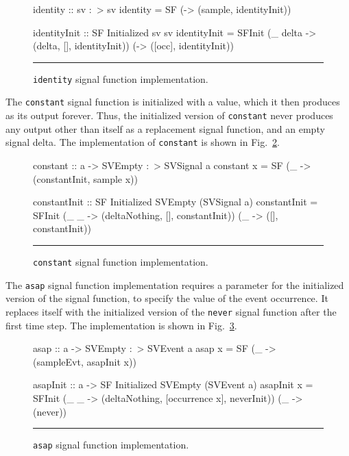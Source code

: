 \documentclass[draft]{llncs}
\begin{document}
\begin{figure}[t]
\begin{code}
identity :: sv :~> sv
identity = SF (\sample -> (sample, identityInit))

identityInit :: SF Initialized sv sv
identityInit = SFInit (\_ delta -> (delta, [], identityInit))
                      (\occ -> ([occ], identityInit))
\end{code}
\hrule
\caption{{\tt identity} signal function implementation.}
\label{figure:identity_signal_function_implementation}
\end{figure}

The {\tt constant} signal function is initialized with a value, which it then
produces as its output forever. Thus, the initialized version of {\tt constant}
never produces any output other than itself as a replacement
signal function, and an empty signal delta. The implementation of {\tt constant}
is shown in Fig.~\ref{figure:constant_signal_function_implementation}.

\begin{figure}
\begin{code}
constant :: a -> SVEmpty :~> SVSignal a
constant x = SF (\_ -> (constantInit, sample x))

constantInit :: SF Initialized SVEmpty (SVSignal a)
constantInit = SFInit (\_ _ -> (deltaNothing, [], constantInit))
                      (\_ -> ([], constantInit))
\end{code}
\hrule
\caption{{\tt constant} signal function implementation.}
\label{figure:constant_signal_function_implementation}
\end{figure}

The {\tt asap} signal function implementation requires a parameter for the
initialized version of the signal function, to specify the value of the event
occurrence. It replaces itself with the initialized version of the {\tt never}
signal function after the first time step. The implementation is shown in
Fig.~\ref{figure:asap_signal_function_implementation}.

\begin{figure}
\begin{code}
asap :: a -> SVEmpty :~> SVEvent a
asap x = SF (\_ -> (sampleEvt, asapInit x))

asapInit :: a -> SF Initialized SVEmpty (SVEvent a)
asapInit x = SFInit (\_ _ -> (deltaNothing, [occurrence x], neverInit))
                    (\_ -> (never))
\end{code}
\hrule
\caption{{\tt asap} signal function implementation.}
\label{figure:asap_signal_function_implementation}
\end{figure}
\end{document}
